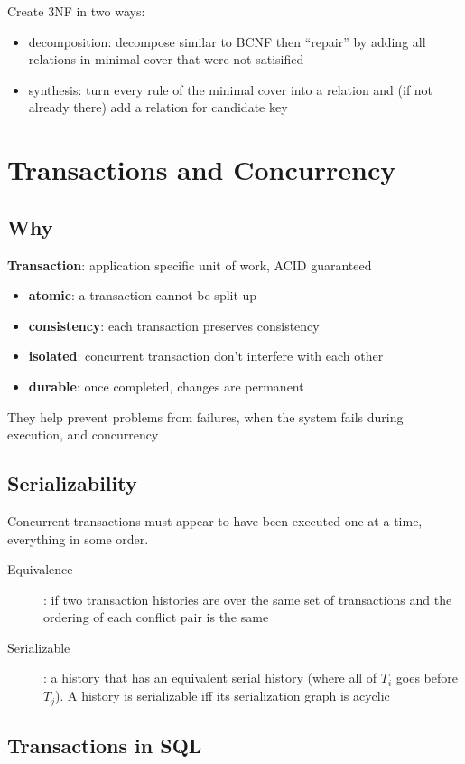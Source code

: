 \documentclass[]{article}
\theoremstyle{definition}
\begin{document}
	Create 3NF in two ways:
	\begin{itemize}
		\item decomposition: decompose similar to BCNF then ``repair'' by adding all relations in minimal cover that were not satisified
		\item synthesis: turn every rule of the minimal cover into a relation and (if not already there) add a relation for candidate key
	\end{itemize}


	\section{Transactions and Concurrency}

	\subsection{Why}
	\textbf{Transaction}: application specific unit of work, ACID guaranteed
	\begin{itemize}
		\item \textbf{atomic}: a transaction cannot be split up 
		\item \textbf{consistency}: each transaction preserves consistency 
		\item \textbf{isolated}: concurrent transaction don't interfere with each other 
		\item \textbf{durable}: once completed, changes are permanent
	\end{itemize}

	They help prevent problems from failures, when the system fails during execution, and concurrency

	\subsection{Serializability}
	Concurrent transactions must appear to have been executed one at a time, everything in some order.
	\begin{description}
		\item[Equivalence]: if two transaction histories are over the same set of transactions and the ordering of each conflict pair is the same
		\item[Serializable]: a history that has an equivalent serial history (where all of $T_i$ goes before $T_j$). A history is serializable iff its
			serialization graph is acyclic
	\end{description}

	\subsection{Transactions in SQL}
\end{document}
